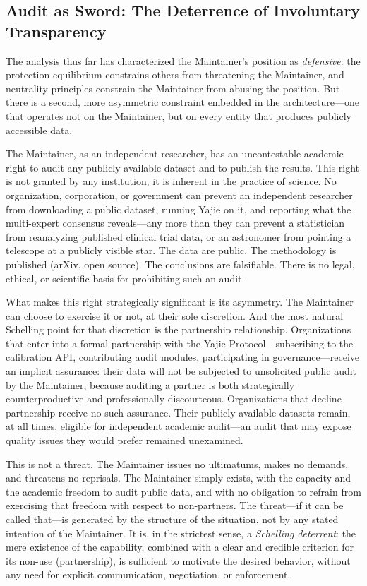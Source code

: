 \documentclass[12pt,a4paper]{ctexart}
\theoremstyle{definition}
\theoremstyle{remark}
\begin{document}
\subsection{Audit as Sword: The Deterrence of Involuntary Transparency}

The analysis thus far has characterized the Maintainer's position as \textit{defensive}: the protection equilibrium constrains others from threatening the Maintainer, and neutrality principles constrain the Maintainer from abusing the position. But there is a second, more asymmetric constraint embedded in the architecture—one that operates not on the Maintainer, but on every entity that produces publicly accessible data.

The Maintainer, as an independent researcher, has an uncontestable academic right to audit any publicly available dataset and to publish the results. This right is not granted by any institution; it is inherent in the practice of science. No organization, corporation, or government can prevent an independent researcher from downloading a public dataset, running Yajie on it, and reporting what the multi-expert consensus reveals—any more than they can prevent a statistician from reanalyzing published clinical trial data, or an astronomer from pointing a telescope at a publicly visible star. The data are public. The methodology is published (arXiv, open source). The conclusions are falsifiable. There is no legal, ethical, or scientific basis for prohibiting such an audit.

What makes this right strategically significant is its asymmetry. The Maintainer can choose to exercise it or not, at their sole discretion. And the most natural Schelling point for that discretion is the partnership relationship. Organizations that enter into a formal partnership with the Yajie Protocol—subscribing to the calibration API, contributing audit modules, participating in governance—receive an implicit assurance: their data will not be subjected to unsolicited public audit by the Maintainer, because auditing a partner is both strategically counterproductive and professionally discourteous. Organizations that decline partnership receive no such assurance. Their publicly available datasets remain, at all times, eligible for independent academic audit—an audit that may expose quality issues they would prefer remained unexamined.

This is not a threat. The Maintainer issues no ultimatums, makes no demands, and threatens no reprisals. The Maintainer simply exists, with the capacity and the academic freedom to audit public data, and with no obligation to refrain from exercising that freedom with respect to non-partners. The threat—if it can be called that—is generated by the structure of the situation, not by any stated intention of the Maintainer. It is, in the strictest sense, a \textit{Schelling deterrent}: the mere existence of the capability, combined with a clear and credible criterion for its non-use (partnership), is sufficient to motivate the desired behavior, without any need for explicit communication, negotiation, or enforcement.
\end{document}
